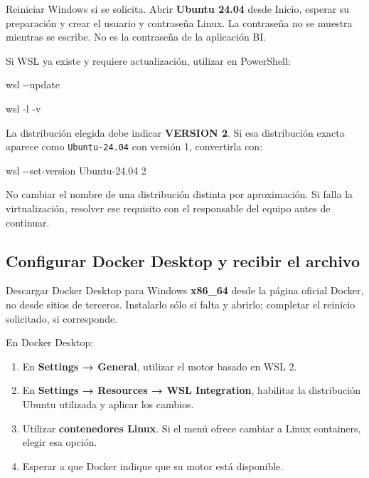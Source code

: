 \documentclass[
  spanish,
  10pt,
  a4paper,
]{article}
\newenvironment{Shaded}{}{}
\newcommand{\DecValTok}[1]{#1}
\newcommand{\NormalTok}[1]{#1}
\newcommand{\OperatorTok}[1]{#1}
\providecommand{\tightlist}{%
  \setlength{\itemsep}{0pt}\setlength{\parskip}{0pt}}
\renewenvironment{Shaded}{\begin{snugshade}}{\end{snugshade}}%
\begin{document}
Reiniciar Windows si se solicita. Abrir \textbf{Ubuntu 24.04} desde
Inicio, esperar su preparación y crear el usuario y contraseña Linux. La
contraseña no se muestra mientras se escribe. No es la contraseña de la
aplicación BI.

Si WSL ya existe y requiere actualización, utilizar en PowerShell:

\begin{Shaded}
\begin{Highlighting}[]
\NormalTok{wsl }\OperatorTok{{-}{-}}\NormalTok{update}
\end{Highlighting}
\end{Shaded}

\begin{Shaded}
\begin{Highlighting}[]
\NormalTok{wsl }\OperatorTok{{-}}\NormalTok{l }\OperatorTok{{-}}\NormalTok{v}
\end{Highlighting}
\end{Shaded}

La distribución elegida debe indicar \textbf{VERSION 2}. Si esa
distribución exacta aparece como \texttt{Ubuntu-24.04} con versión 1,
convertirla con:

\begin{Shaded}
\begin{Highlighting}[]
\NormalTok{wsl }\OperatorTok{{-}{-}}\NormalTok{set{-}version Ubuntu{-}24}\OperatorTok{.}\DecValTok{04} \DecValTok{2}
\end{Highlighting}
\end{Shaded}

No cambiar el nombre de una distribución distinta por aproximación. Si
falla la virtualización, resolver ese requisito con el responsable del
equipo antes de continuar.

\clearpage

\subsection{Configurar Docker Desktop y recibir el
archivo}\label{configurar-docker-desktop-y-recibir-el-archivo}

Descargar Docker Desktop para Windows \textbf{x86\_64} desde la página
oficial Docker, no desde sitios de terceros. Instalarlo sólo si falta y
abrirlo; completar el reinicio solicitado, si corresponde.

En Docker Desktop:

\begin{enumerate}
\def\labelenumi{\arabic{enumi}.}
\tightlist
\item
  En \textbf{Settings → General}, utilizar el motor basado en WSL 2.
\item
  En \textbf{Settings → Resources → WSL Integration}, habilitar la
  distribución Ubuntu utilizada y aplicar los cambios.
\item
  Utilizar \textbf{contenedores Linux}. Si el menú ofrece cambiar a
  Linux containers, elegir esa opción.
\item
  Esperar a que Docker indique que su motor está disponible.
\end{enumerate}
\end{document}
